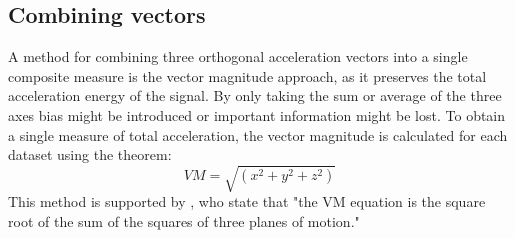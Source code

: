 \subsection{Combining vectors}
A method for combining three orthogonal acceleration vectors into a single composite measure is the vector magnitude approach, as it preserves the total acceleration energy of the signal. By only taking the sum or average of the three axes bias might be introduced or important information might be lost. To obtain a single measure of total acceleration, the vector magnitude is calculated for each dataset using the theorem:
\begin{equation}
    VM = \sqrt{(x^2 + y^2 + z^2)}
\end{equation}
This method is supported by \cite{formulaCombiningVectors}, who state that "the VM equation is the square root of the sum of the squares of three planes of motion."